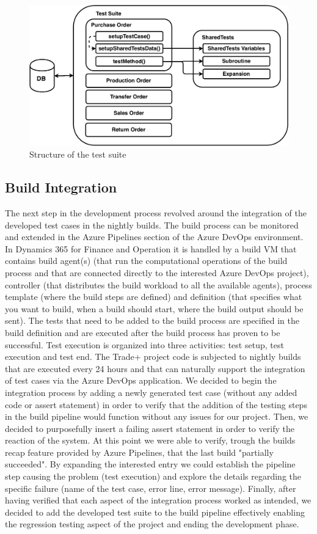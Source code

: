 \begin{figure}[ht]
	\centering
	\includegraphics[scale=0.6]{Images/TestSuite.pdf}
	\caption{Structure of the test suite}
	\label{fig:TestSuite}
\end{figure}

\subsection{Build Integration}

The next step in the development process revolved around the integration of the developed test cases in the nightly builds. The build process can be monitored and extended in the Azure Pipelines section of the Azure DevOps environment. In Dynamics 365 for Finance and Operation it is handled by a build VM that contains build agent(s) (that run the computational operations of the build process and that are connected directly to the interested Azure DevOps project), controller (that distributes the build workload to all the available agents), process template (where the build steps are defined) and definition (that specifies what you want to build, when a build should start, where the build output should be sent). The tests that need to be added to the build process are specified in the build definition and are executed after the build process has proven to be successful. Test execution is organized into three activities: test setup, test execution and test end. The Trade+ project code is subjected to nightly builds that are executed every 24 hours and that can naturally support the integration of test cases via the Azure DevOps application. We decided to begin the integration process by adding a newly generated test case (without any added code or assert statement) in order to verify that the addition of the testing steps in the build pipeline would function without any issues for our project. Then, we decided to purposefully insert a failing assert statement in order to verify the reaction of the system. At this point we were able to verify, trough the builds recap feature provided by Azure Pipelines, that the last build "partially succeeded". By expanding the interested entry we could establish the pipeline step causing the problem (test execution) and explore the details regarding the specific failure (name of the test case, error line, error message). Finally, after having verified that each aspect of the integration process worked as intended, we decided to add the developed test suite to the build pipeline effectively enabling the regression testing aspect of the project and ending the development phase.


